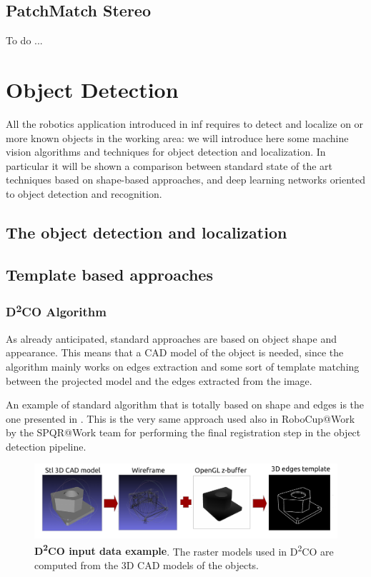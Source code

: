 \subsection{PatchMatch Stereo}\label{subsec:patchmatchstereo}
To do ...

\section{Object Detection}\label{sec:objectdetection}
All the robotics application introduced in inf \secref{\label{sec:roboticsinindustry}} requires to detect and localize on or more known objects in the working area: we will introduce here some machine vision algorithms and techniques for object detection and localization. In particular it will be shown a comparison between standard state of the art techniques based on shape-based approaches, and deep learning networks oriented to object detection and recognition.

\subsection{The object detection and localization}
\subsection{Template based approaches}
\subsubsection{D\textsuperscript{2}{CO} Algorithm}\label{subsec:d2co}
As already anticipated, standard approaches are based on object shape and appearance. This means that a CAD model of the object is needed, since the algorithm mainly works on edges extraction and some sort of template matching between the projected model and the edges extracted from the image.

An example of standard algorithm that is totally based on shape and edges is the one presented in \cite{imperoli2015d2co}. This is the very same approach used also in RoboCup@Work by the SPQR@Work team for performing the final registration step in the object detection pipeline. 

\begin{figure}
    \centering
    \includegraphics[width=\textwidth]{figures/1_perception_and_sensing_in_robotics/d2co_00}
    \caption{\textbf{D\textsuperscript{2}CO input data example}. The raster models used in D\textsuperscript{2}CO are computed from the 3D CAD models of the objects.} 
    \label{fig:d2co_00}
\end{figure}

